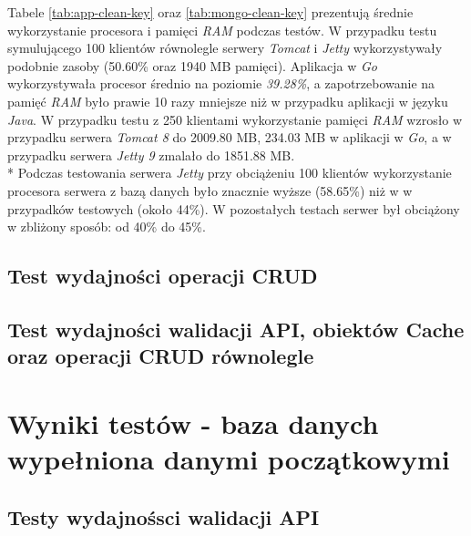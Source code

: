 Tabele \ref{tab:app-clean-key} oraz \ref{tab:mongo-clean-key} prezentują średnie wykorzystanie procesora i pamięci \textsl{RAM} podczas testów. W przypadku testu symulującego 100 klientów równolegle serwery \textsl{Tomcat} i \textsl{Jetty} wykorzystywały podobnie zasoby (50.60\% oraz 1940 MB pamięci). Aplikacja w \textsl{Go} wykorzystywała procesor średnio na poziomie \textsl{39.28\%}, a zapotrzebowanie na pamięć \textsl{RAM} było prawie 10 razy mniejsze niż w przypadku aplikacji w języku \textsl{Java}. W przypadku testu z 250 klientami wykorzystanie pamięci \textsl{RAM} wzrosło w przypadku serwera \textsl{Tomcat 8} do 2009.80 MB, 234.03 MB w aplikacji w \textsl{Go}, a w przypadku serwera \textsl{Jetty 9} zmalało do 1851.88 MB.\\*
Podczas testowania serwera \textsl{Jetty} przy obciążeniu 100 klientów wykorzystanie procesora serwera z bazą danych było znacznie wyższe (58.65\%) niż w w przypadków testowych (około 44\%).  W pozostałych testach serwer był obciążony w zbliżony sposób: od 40\% do 45\%.
 


\clearpage

\subsection{Test wydajności operacji CRUD}
% 
% 
\clearpage

\subsection{Test wydajności walidacji API, obiektów Cache oraz operacji CRUD równolegle}
% 
% 
\clearpage

\newpage
\section{Wyniki testów - baza danych wypełniona danymi początkowymi}
\subsection{Testy wydajnośsci walidacji API}
% 
% 
\clearpage

